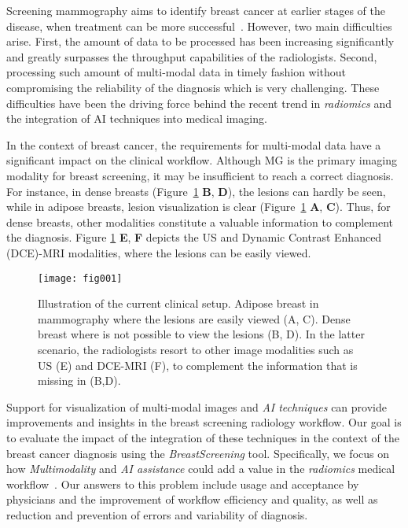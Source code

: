 Screening mammography aims to identify breast cancer at earlier stages of the disease, when treatment can be more successful~\cite{mckinney2020international}.
However, two main difficulties arise.
First, the amount of data to be processed has been increasing significantly and greatly surpasses the throughput capabilities of the radiologists.
Second, processing such amount of multi-modal data in timely fashion without compromising the reliability of the diagnosis which is very challenging.
These difficulties have been the driving force behind the recent trend in {\it radiomics} and the integration of AI techniques into medical imaging.

In the context of breast cancer, the requirements for multi-modal data have a significant impact on the clinical workflow.
Although MG is the primary imaging modality for breast screening, it may be insufficient to reach a correct diagnosis.
For instance, in dense breasts (Figure~\ref{fig:fig001} {\bf B}, {\bf D}), the lesions can hardly be seen, while in adipose breasts, lesion visualization is clear (Figure~\ref{fig:fig001} {\bf A}, {\bf C}).
Thus, for dense breasts, other modalities constitute a valuable information to complement the diagnosis.
Figure \ref{fig:fig001} {\bf E}, {\bf F} depicts the US and Dynamic Contrast Enhanced (DCE)-MRI modalities, where the lesions can be easily viewed.

\hfill
\begin{figure}[ht]
\centering
\texttt{[image: fig001]}
\caption{Illustration of the current clinical setup. Adipose breast in mammography where the lesions are easily viewed (A, C). Dense breast where is not possible to view the lesions (B, D). In the latter scenario, the radiologists resort to other image modalities such as US (E) and DCE-MRI (F), to complement the information that is missing in (B,D).}
\label{fig:fig001}
\end{figure}
\hfill

Support for visualization of multi-modal images and {\it AI techniques} can provide improvements and insights in the breast screening radiology workflow.
Our goal is to evaluate the impact of the integration of these techniques in the context of the breast cancer diagnosis using the {\it BreastScreening} tool.
Specifically, we focus on how {\it Multimodality} and {\it AI assistance} could add a value in the {\it radiomics} medical workflow~\cite{calisto2017mimbcdui}.
Our answers to this problem include usage and acceptance by physicians and the improvement of workflow efficiency and quality, as well as reduction and prevention of errors and variability of diagnosis.

